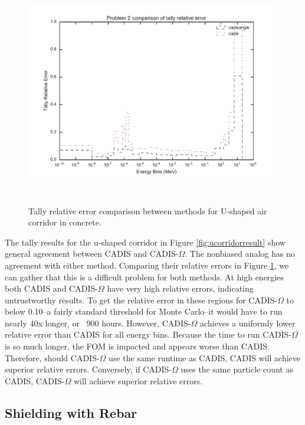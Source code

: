 \begin{figure}[h!]
  \centering
  \includegraphics[height=10cm]{./chapters/characterization_probs/figures/char/prob_2/problem_2_tally_error_compare.pdf}
  \caption[Tally relative error comparison between methods for U-shaped air
  corridor in concrete.]
  {Tally relative error comparison between methods for U-shaped air corridor in
  concrete.}
  \label{fig:ucorridorerror}
\end{figure}

The tally results for the u-shaped corridor in Figure \ref{fig:ucorridorresult}
show general agreement between CADIS and CADIS-$\Omega$. The nonbiased analog
has no agreement with either method. Comparing their relative errors in Figure
\ref{fig:ucorridorerror}, we can gather that this is a difficult problem for
both methods. At high energies both CADIS and CADIS-$\Omega$ have very high
relative errors, indicating untrustworthy results. To get the relative error in
these regions for CADIS-$\Omega$ to below 0.10--a fairly standard threshold for
Monte Carlo--it would have to run nearly 40x longer, or ~900 hours. However,
CADIS-$\Omega$ achieves a uniformly lower relative error than CADIS for all
energy bins. Because the time to run CADIS-$\Omega$ is so much longer, the FOM
is impacted and appears worse than CADIS. Therefore, should CADIS-$\Omega$ use
the same runtime as CADIS, CADIS will achieve superior relative errors.
Conversely, if CADIS-$\Omega$ uses the same particle count as CADIS,
CADIS-$\Omega$ will achieve superior relative errors.

\subsection{Shielding with Rebar}
\label{subsec:resultrebar}

